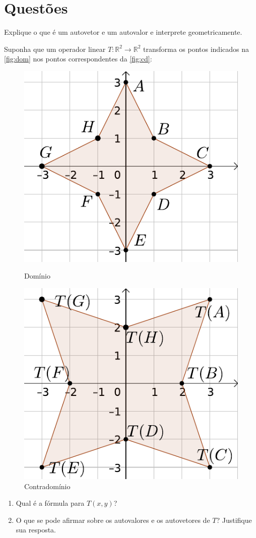\documentclass[12pt,a4paper]{article}
\newcommand{\fixme}{{\color{red}(...)}}
\newcommand*\R{\mathbb{R}}
\begin{document}
\section*{Questões}
\begin{ExerciseList}
\Exercise[title={1,0}] Explique o que é um autovetor e um autovalor e interprete geometricamente.
\Answer \fixme

\Exercise[title={3,0}] Suponha que um operador linear $T: \R^2 \to \R^2$ transforma os pontos indicados na \autoref{fig:dom} nos pontos correspondentes da \autoref{fig:cd}:
\begin{figure}[h]
    \centering
    \begin{minipage}{0.45\textwidth}
        \centering
        \includegraphics[height=0.48\textwidth]{img/prova-4-pro-dom}
        \caption{Domínio}\label{fig:dom}
    \end{minipage}\hfill
    \begin{minipage}{0.45\textwidth}
        \centering
        \includegraphics[height=0.48\textwidth]{img/prova-4-pro-img}
        \caption{Contradomínio}\label{fig:cd}
    \end{minipage}
\end{figure}
\begin{enumerate}
\item Qual é a fórmula para $T(x,y)$?
\item O que se pode afirmar sobre os autovalores e os autovetores de $T$? Justifique sua resposta.
\end{enumerate}
\Answer \fixme


\end{ExerciseList}
\end{document}
